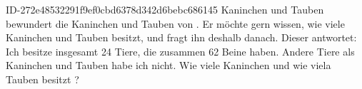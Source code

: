 \begin{exercise}
      {ID-272e48532291f9ef0cbd6378d342d6bebc686145}
      {Kaninchen und Tauben}
  \ifproblem\problem
    \xya{} bewundert die Kaninchen und Tauben von \xyb. Er möchte gern wissen,
    wie viele Kaninchen und Tauben \xyb{} besitzt, und fragt ihn deshalb danach.
    Dieser antwortet: \glqq{}Ich besitze insgesamt 24 Tiere, die zusammen 62 Beine
    haben. Andere Tiere als Kaninchen und Tauben habe ich nicht.\grqq{}
    Wie viele Kaninchen und wie viela Tauben besitzt \xyb?
  \fi
\end{exercise}
